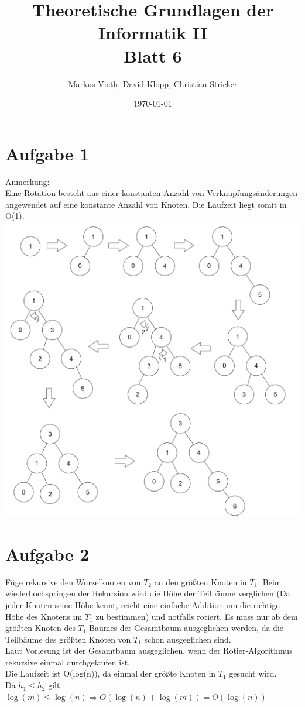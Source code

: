 \documentclass[a4paper,11pt,twoside]{article}
\title{Theoretische Grundlagen der Informatik II\\ Blatt 6}
\author{Markus Vieth, David Klopp, Christian Stricker}
\date{\today}
\begin{document}
\maketitle
\cleardoublepage
\pagestyle{myheadings}

\section*{Aufgabe 1}
\underline{Anmerkung: }\\ Eine Rotation besteht aus einer konstanten Anzahl von Verknüpfungsänderungen angewendet auf eine konstante Anzahl von Knoten. Die Laufzeit liegt somit in O(1). \\
\includegraphics*[scale=0.2]{Images/Nr_1.png}

\section*{Aufgabe 2}
Füge rekursive den Wurzelknoten von $T_2$ an den größten Knoten in $T_1$. Beim wiederhochspringen der Rekursion wird die Höhe der Teilbäume verglichen (Da jeder Knoten seine Höhe kennt, reicht eine einfache Addition um die richtige Höhe des Knotens im $T_1$ zu bestimmen) und notfalls rotiert. Es muss nur ab dem größten Knoten des $T_1$ Baumes der Gesamtbaum ausgeglichen werden, da die Teilbäume des größten Knoten von $T_1$ schon ausgeglichen sind. \\
Laut Vorlesung ist der Gesamtbaum ausgeglichen, wenn der Rotier-Algorithmus rekursive einmal durchgelaufen ist. \\
Die Laufzeit ist O(log(n)), da einmal der größte Knoten in $T_1$ gesucht wird. \\
Da $h_1 \leq h_2$ gilt: $\log(m) \leq \log(n) \Rightarrow O(\log(n)+\log(m)) = O(\log(n)) $
\end{document}
